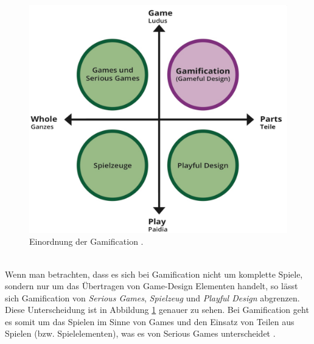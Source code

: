 \documentclass[a4paper,12pt,twoside]{scrartcl}
\begin{document}
\\
\begin{figure}[h!]
\begin{center}
\includegraphics[scale = 0.4]{Bilder/PlayGame.eps}
\caption{Einordnung der Gamification \cite{PlayGame2018}.}
\label{PlayGameBild}
\end{center}
\end{figure}
\\
Wenn man betrachten, dass es sich bei Gamification nicht um komplette Spiele, sondern nur um das Übertragen von Game-Design Elementen handelt, so lässt sich Gamification von \textit{Serious Games}, \textit{Spielzeug} und \textit{Playful Design} abgrenzen. Diese Unterscheidung ist in Abbildung \ref{PlayGameBild} genauer zu sehen. Bei Gamification geht es somit um das Spielen im Sinne von Games und den Einsatz von Teilen aus Spielen (bzw. Spielelementen), was es von Serious Games unterscheidet \cite{PlayGame2018}.
\end{document}
